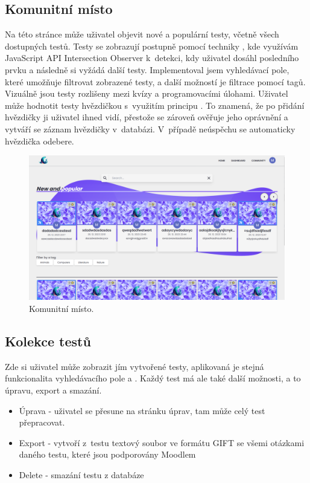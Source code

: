 \documentclass[12pt, a4paper,
openright
]{report}
\begin{document}
\subsection{Komunitní místo}
\label{subsec:community}
Na této stránce může uživatel objevit nové a populární testy, včetně všech dostupných testů. Testy se zobrazují postupně pomocí techniky , kde využívám JavaScript API Intersection Observer k~detekci, kdy uživatel dosáhl posledního prvku a následně si vyžádá další testy. Implementoval jsem vyhledávací pole, které umožňuje filtrovat zobrazené testy, a další možností je filtrace pomocí tagů. Vizuálně jsou testy rozlišeny mezi kvízy a programovacími úlohami. Uživatel může hodnotit testy hvězdičkou s~využitím principu . To znamená, že po přidání hvězdičky ji uživatel ihned vidí, přestože se zároveň ověřuje jeho oprávnění a vytváří se záznam hvězdičky v~databázi. V~případě neúspěchu se automaticky hvězdička odebere.

\begin{figure}[H]
	\centering %
	\includegraphics[width=1\linewidth]{image/community.png} 
	\caption{Komunitní místo.} %
	\label{fig:community} %
\end{figure}


\subsection{Kolekce testů}
\label{subsec:collection}
Zde si uživatel může zobrazit jím vytvořené testy, aplikovaná je stejná funkcionalita vyhledávacího pole a . Každý test má ale také další možnosti, a to úpravu, export a smazání.
\begin{itemize}
	\item Úprava - uživatel se přesune na stránku úprav, tam může celý test přepracovat.
	\item Export - vytvoří z~testu textový soubor ve formátu GIFT se všemi otázkami daného testu, které jsou podporovány Moodlem
	\item Delete - smazání testu z databáze
\end{itemize}
\end{document}
